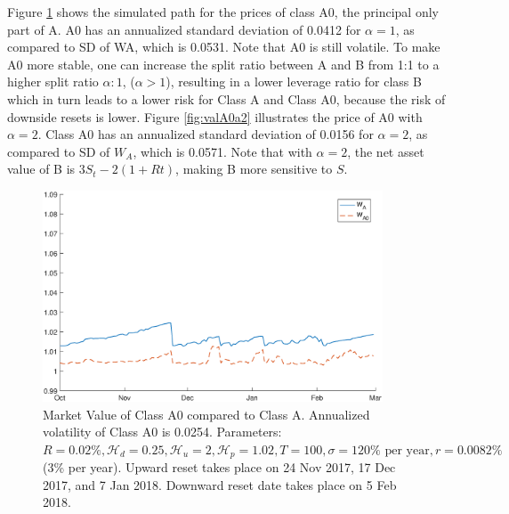 \documentclass[final,pdftex]{ectaart}
\theoremstyle{plain}
\begin{document}
\begin{appendices}
Figure \ref{fig:valA0a1} shows the simulated path for the prices of class A0, the principal only part of A. A0 has an annualized standard deviation of 0.0412 for $\alpha=1$, as compared to SD of WA, which is 0.0531. Note that A0 is still volatile. To make A0 more stable, one can increase the split ratio between A and B from 1:1 to a higher split ratio $\alpha:1$, ($\alpha >1$), resulting in a lower leverage ratio for class B which in turn leads to a lower risk for Class A and Class A0, because the risk of downside resets is lower. Figure \ref{fig:valA0a2} illustrates the price of A0 with $\alpha=2$. Class A0 has an annualized standard deviation of 0.0156 for $\alpha=2$, as compared to SD of $W_A$, which is 0.0571. Note that with $\alpha = 2$, the net asset value of B is $3S_t-2(1+Rt)$, making B more sensitive to $S$.


\begin{figure}[htb]
\centering
\includegraphics[width=0.9\textwidth]{WA0_alpha1.eps}
\caption{Market Value of Class A0 compared to Class A. Annualized volatility of Class A0 is 0.0254. Parameters: $R=0.02\%,\mathcal{H}_{d}=0.25,\mathcal{H}_{u} =2,\mathcal{H}_{p}=1.02,T=100,\sigma= 120 \% \text{ per year}, r=0.0082\%$ (3\% per year). Upward reset takes place on 24 Nov 2017, 17 Dec 2017, and 7 Jan 2018. Downward reset date takes place on 5 Feb 2018.}
\label{fig:valA0a1}
\end{figure}



\end{appendices}
\end{document}

